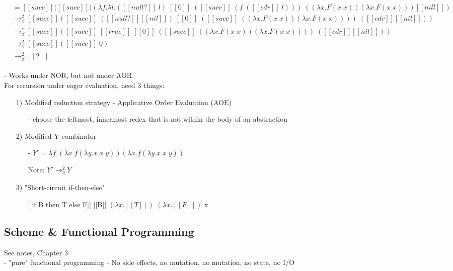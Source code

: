 \documentclass[11pt]{article}
\begin{document}
\begin{align*}
&= [[succ]]([[succ]]((\lambda f.\lambda l.([[null?]]\; l)\;[[0]]\;([[succ]]\;(f\;([[cdr]]\;l)))\;((\lambda x.F(x\;x))(\lambda x.F(x\;x))) [[nill]]) \\
&\rightarrow_\beta^2 [[succ]]([[succ]]\;([[null?]][[nil]])\;[[0]]\;([[succ]]\;((\lambda x.F(x\;x))(\lambda x.F(x\;x))))\;([[cdr]][[nil]])) \\
&\rightarrow_\beta^* [[succ]]([[succ]]\;[[true]]\;[[0]]\;([[succ]]\;((\lambda x.F(x\;x))(\lambda x.F(x\;x))))\;([[cdr]][[nil]]))  \\
&\rightarrow_\beta^2 [[succ]]([[succ]]\;0) \\
&\rightarrow_\beta^2 [[2]]
\end{align*}

- Works under NOR, but not under AOR. \\

For recursion under eager evaluation, need 3 things:
\begin{itemize}
	\item[1)] Modified reduction strategy - Applicative Order Evaluation (AOE)
	\begin{itemize}
		\item[-] choose the leftmost, innermost redex that is not within the body of an abstraction
	\end{itemize}
	\item[2)] Modified Y combinator
	\begin{itemize}
		\item[-] $Y' = \lambda f.(\lambda x.f(\lambda y.x\;x\;y))(\lambda x.f(\lambda y.x\;x\;y))$
		\item[] Note: $Y' \rightarrow_\eta^2 Y$
	\end{itemize}
	\item[3)] "Short-circuit if-then-else"
	\begin{itemize}
		\item[] [[if B then T else F]] [[B]] $(\lambda x.[[T]])$ $(\lambda x.[[F]])$ x
	\end{itemize}
\end{itemize}

\pagebreak
\subsection{Scheme \& Functional Programming}

See notes, Chapter 3 \\

- "pure" functional programming - No side effects, no mutation, no mutation, no state, no I/O \\
\end{document}
